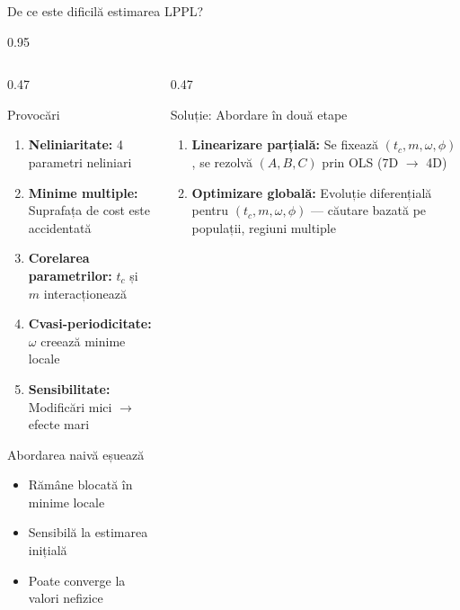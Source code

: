 \documentclass[9pt, aspectratio=169, t]{beamer}
\begin{document}
\begin{frame}{De ce este dificilă estimarea LPPL?}
    \begin{cminipage}{0.95\textwidth}
    {\footnotesize
    \begin{columns}[T]
        \begin{column}{0.47\textwidth}
            \begin{alertblock}{Provocări}
                \begin{enumerate}\setlength{\itemsep}{1pt}
                    \item \textbf{Neliniaritate:} 4 parametri neliniari
                    \item \textbf{Minime multiple:} Suprafața de cost este accidentată
                    \item \textbf{Corelarea parametrilor:} $t_c$ și $m$ interacționează
                    \item \textbf{Cvasi-periodicitate:} $\omega$ creează minime locale
                    \item \textbf{Sensibilitate:} Modificări mici $\to$ efecte mari
                \end{enumerate}
            \end{alertblock}

            \begin{block}{Abordarea naivă eșuează}
                \begin{itemize}\setlength{\itemsep}{0pt}
                    \item Rămâne blocată în minime locale
                    \item Sensibilă la estimarea inițială
                    \item Poate converge la valori nefizice
                \end{itemize}
            \end{block}
        \end{column}
        \begin{column}{0.47\textwidth}
            \begin{exampleblock}{Soluție: Abordare în două etape}
                \begin{enumerate}\setlength{\itemsep}{1pt}
                    \item \textbf{Linearizare parțială:} Se fixează $(t_c, m, \omega, \phi)$, se rezolvă $(A, B, C)$ prin OLS (7D $\to$ 4D)
                    \item \textbf{Optimizare globală:} Evoluție diferențială pentru $(t_c, m, \omega, \phi)$ --- căutare bazată pe populații, regiuni multiple
                \end{enumerate}
            \end{exampleblock}


\end{column}
\end{columns}}
\end{cminipage}
\end{frame}
\end{document}
